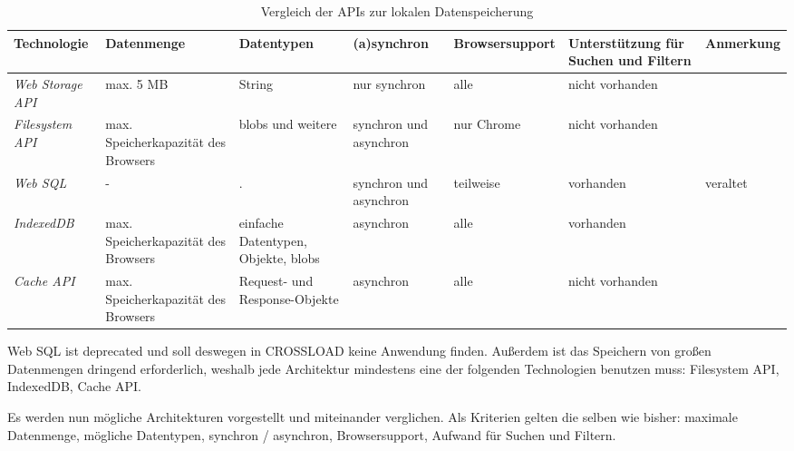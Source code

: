 \begin{sidewaystable}[h]
  \renewcommand{\arraystretch}{1.2}
  \centering
  \sffamily
  \begin{footnotesize}
    \begin{tabularx}{1.0\textwidth}{l L L L l l L}
      \toprule
      \textbf{Technologie} & \textbf{Datenmenge} & \textbf{Datentypen} & \textbf{(a)synchron} & \textbf{Browsersupport} & \textbf{Unterstützung für Suchen und Filtern} & \textbf{Anmerkung} \\
      \midrule
      \emph{Web Storage \ac{API}} & max. 5 \ac{MB} & String & nur synchron & alle & nicht vorhanden & \\
      \emph{Filesystem \ac{API}} & max. Speicherkapazität des Browsers & \acp{blob} und weitere & synchron und asynchron & nur Chrome & nicht vorhanden &  \\
      \emph{Web SQL} & - & . & synchron und asynchron & teilweise & vorhanden & veraltet \\
      \emph{IndexedDB} & max. Speicherkapazität des Browsers & einfache Datentypen, Objekte, \acp{blob} & asynchron & alle & vorhanden & \\
      \emph{Cache \ac{API}} & max. Speicherkapazität des Browsers & Request- und Response-Objekte & asynchron & alle & nicht vorhanden & \\
      \bottomrule
    \end{tabularx}
  \end{footnotesize}
  \rmfamily
  \caption{Vergleich der APIs zur lokalen Datenspeicherung}
  \label{Kap4:Datenspeicherung}
\end{sidewaystable}

\clearpage

Web SQL ist deprecated und soll deswegen in CROSSLOAD keine Anwendung finden. Außerdem ist das Speichern von großen Datenmengen dringend erforderlich, weshalb jede Architektur mindestens eine der folgenden Technologien benutzen muss: Filesystem \ac{API}, IndexedDB, Cache \ac{API}.

Es werden nun mögliche Architekturen vorgestellt und miteinander verglichen. Als Kriterien gelten die selben wie bisher: maximale Datenmenge, mögliche Datentypen, synchron / asynchron, Browsersupport, Aufwand für Suchen und Filtern.

